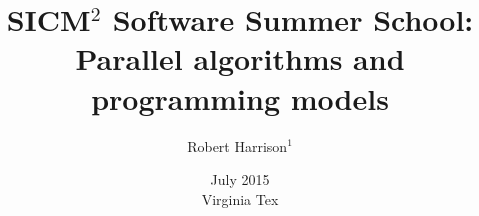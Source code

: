 \documentclass[11pt]{beamer}
\title[SICM$^2$]{
SICM$^2$ Software Summer School: \\
Parallel algorithms and programming models
}
\author[]{
Robert Harrison$^1$ 
}
\institute[]{
$^1$ Stony Brook University 
}
\date[July 2015]{July 2015 \\ Virginia Tex}
\begin{document}
\frame{\titlepage}


\end{document}
